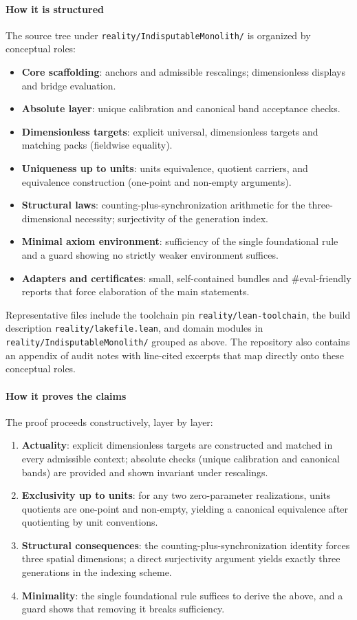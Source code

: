 \documentclass{article}
\newcommand{\FileRef}[1]{\texttt{#1}}
\begin{document}
\paragraph{How it is structured} The source tree under \FileRef{reality/IndisputableMonolith/} is organized by conceptual roles:
\begin{itemize}[leftmargin=*]
  \item \textbf{Core scaffolding}: anchors and admissible rescalings; dimensionless displays and bridge evaluation.
  \item \textbf{Absolute layer}: unique calibration and canonical band acceptance checks.
  \item \textbf{Dimensionless targets}: explicit universal, dimensionless targets and matching packs (fieldwise equality).
  \item \textbf{Uniqueness up to units}: units equivalence, quotient carriers, and equivalence construction (one-point and non-empty arguments).
  \item \textbf{Structural laws}: counting-plus-synchronization arithmetic for the three-dimensional necessity; surjectivity of the generation index.
  \item \textbf{Minimal axiom environment}: sufficiency of the single foundational rule and a guard showing no strictly weaker environment suffices.
  \item \textbf{Adapters and certificates}: small, self-contained bundles and #eval-friendly reports that force elaboration of the main statements.
\end{itemize}

Representative files include the toolchain pin \FileRef{reality/lean-toolchain}, the build description \FileRef{reality/lakefile.lean}, and domain modules in \FileRef{reality/IndisputableMonolith/} grouped as above. The repository also contains an appendix of audit notes with line-cited excerpts that map directly onto these conceptual roles.

\paragraph{How it proves the claims} The proof proceeds constructively, layer by layer:
\begin{enumerate}[leftmargin=*]
  \item \textbf{Actuality}: explicit dimensionless targets are constructed and matched in every admissible context; absolute checks (unique calibration and canonical bands) are provided and shown invariant under rescalings.
  \item \textbf{Exclusivity up to units}: for any two zero-parameter realizations, units quotients are one-point and non-empty, yielding a canonical equivalence after quotienting by unit conventions.
  \item \textbf{Structural consequences}: the counting-plus-synchronization identity forces three spatial dimensions; a direct surjectivity argument yields exactly three generations in the indexing scheme.
  \item \textbf{Minimality}: the single foundational rule suffices to derive the above, and a guard shows that removing it breaks sufficiency.
\end{enumerate}
\end{document}
